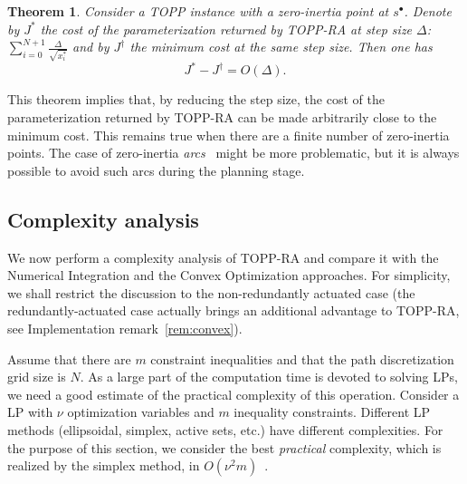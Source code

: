 \documentclass[journal]{IEEEtran}
\theoremstyle{plain}
\newtheorem{theorem}{Theorem}
\theoremstyle{definition}
\theoremstyle{definition}
\begin{document}
\begin{theorem}
  \label{theo:2}
  Consider a TOPP instance with a zero-inertia point at
  $s^\bullet$. Denote by $J^*$ the cost of the parameterization
  returned by TOPP-RA at step size $\Delta$:
  $\sum_{i=0}^{N+1}\frac{\Delta}{\sqrt{x_{i}^{*}}}$ and by $J^\dagger$ the
  minimum cost at the same step size. Then one has
  \[
  J^* - J^\dagger = O(\Delta).
  \]
\end{theorem}



This theorem implies that, by reducing the step size, the cost of the
parameterization returned by TOPP-RA can be made arbitrarily close to
the minimum cost. This remains true when there are a finite number of
zero-inertia points. The case of zero-inertia
\emph{arcs}~\cite{shiller1992computation} might be more problematic,
but it is always possible to avoid such arcs during the planning
stage.


\subsection{Complexity analysis}
\label{sec:runn-time-analys}

We now perform a complexity analysis of TOPP-RA and compare it with
the Numerical Integration and the Convex Optimization approaches. For
simplicity, we shall restrict the discussion to the non-redundantly
actuated case (the redundantly-actuated case actually brings an
additional advantage to TOPP-RA, see Implementation
remark~\ref{rem:convex}).

Assume that there are $m$ constraint inequalities and that the path
discretization grid size is $N$.  As a large part of the computation
time is devoted to solving LPs, we need a good estimate of the
practical complexity of this operation. Consider a LP with $\nu$
optimization variables and $m$ inequality constraints. Different LP
methods (ellipsoidal, simplex, active sets, etc.) have different
complexities. For the purpose of this section, we consider the best
\emph{practical} complexity, which is realized by the simplex method,
in $O(\nu^2 m)$~\cite{Boyd:2004:CO:993483}.
\end{document}
